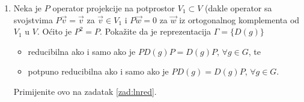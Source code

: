 \begin{enumerate}[label=\arabic{chapter}.\arabic*.]
\item Neka je $P$ operator projekcije na potprostor $V_1 \subset V$ (dakle operator sa svojstvima
$P \vec{v} = \vec{v}$ za $\vec{v}\in V_1$ i $P \vec{w} = 0$ za $\vec{w}$ iz ortogonalnog komplementa
od $V_1$ u $V$. Oćito je $P^2 = P$. Pokažite  da je reprezentacija $\Gamma = \{D(g)\}$ 
\begin{itemize}
\item reducibilna ako i samo ako je $PD(g)P = D(g)P$, $\forall g\in G$, te
\item potpuno reducibilna ako i samo ako je $PD(g) = D(g)P$, $\forall g\in G$.
\end{itemize}
Primijenite ovo na zadatak \ref{zad:lnred}.

\end{enumerate}

